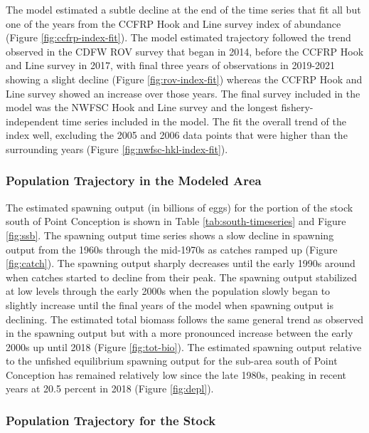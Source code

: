 \documentclass[11pt,
  english,
  letterpaper,
]{article}
\begin{document}
The model estimated a subtle decline at the end of the time series that fit all but one of the years from the CCFRP Hook and Line survey index of abundance (Figure \ref{fig:ccfrp-index-fit}). The model estimated trajectory followed the trend observed in the CDFW ROV survey that began in 2014, before the CCFRP Hook and Line survey in 2017, with final three years of observations in 2019-2021 showing a slight decline (Figure \ref{fig:rov-index-fit}) whereas the CCFRP Hook and Line survey showed an increase over those years. The final survey included in the model was the NWFSC Hook and Line survey and the longest fishery-independent time series included in the model. The fit the overall trend of the index well, excluding the 2005 and 2006 data points that were higher than the surrounding years (Figure \ref{fig:nwfsc-hkl-index-fit}).

\hypertarget{population-trajectory-in-the-modeled-area}{%
\subsubsection{Population Trajectory in the Modeled Area}\label{population-trajectory-in-the-modeled-area}}

The estimated spawning output (in billions of eggs) for the portion of the stock south of Point Conception is shown in Table \ref{tab:south-timeseries} and Figure \ref{fig:ssb}. The spawning output time series shows a slow decline in spawning output from the 1960s through the mid-1970s as catches ramped up (Figure \ref{fig:catch}). The spawning output sharply decreases until the early 1990s around when catches started to decline from their peak. The spawning output stabilized at low levels through the early 2000s when the population slowly began to slightly increase until the final years of the model when spawning output is declining. The estimated total biomass follows the same general trend as observed in the spawning output but with a more pronounced increase between the early 2000s up until 2018 (Figure \ref{fig:tot-bio}). The estimated spawning output relative to the unfished equilibrium spawning output for the sub-area south of Point Conception has remained relatively low since the late 1980s, peaking in recent years at 20.5 percent in 2018 (Figure \ref{fig:depl}).

\hypertarget{population-trajectory-for-the-stock}{%
\subsubsection{Population Trajectory for the Stock}\label{population-trajectory-for-the-stock}}
\end{document}
